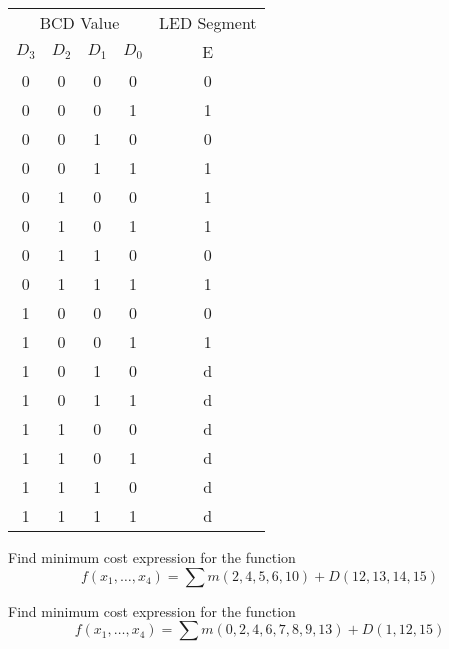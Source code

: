 
\begin{tabular}{cccc|c}
  \toprule
  \multicolumn{4}{c|}{BCD Value} & LED Segment \\
  $D_3$ & $D_2$ & $D_1$ & $D_0$ & E \\
  \midrule
  0 & 0 & 0 & 0 & 0\\
  0 & 0 & 0 & 1 & 1\\
  0 & 0 & 1 & 0 & 0\\
  0 & 0 & 1 & 1 & 1\\
  0 & 1 & 0 & 0 & 1\\
  0 & 1 & 0 & 1 & 1\\
  0 & 1 & 1 & 0 & 0\\
  0 & 1 & 1 & 1 & 1\\
  1 & 0 & 0 & 0 & 0\\
  1 & 0 & 0 & 1 & 1\\
  1 & 0 & 1 & 0 & d\\
  1 & 0 & 1 & 1 & d\\
  1 & 1 & 0 & 0 & d\\
  1 & 1 & 0 & 1 & d\\
  1 & 1 & 1 & 0 & d\\
  1 & 1 & 1 & 1 & d\\
  \bottomrule
\end{tabular}

\begin{example}
  Find minimum cost expression for the function
  \[ f(x_1, \dots, x_4) = \sum m(2, 4, 5, 6, 10) + D(12, 13, 14, 15) \]
\end{example}
\vspace{10em}

\begin{prob}[10 marks]
  Find minimum cost expression for the function
  \[ f(x_1, \dots, x_4) = \sum m(0, 2, 4, 6, 7, 8, 9, 13) + D(1, 12, 15) \]
\end{prob}
\vspace{10em}
